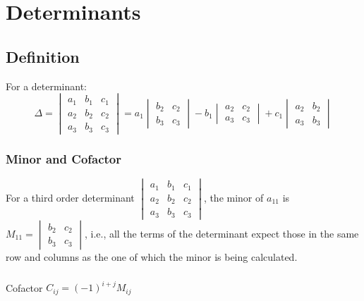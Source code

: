 \large{\chapter{Determinants}}
\section{Definition}
For a determinant:
\begin{equation}
	\Delta=\begin{vmatrix}
		a_1&b_1&c_1\\
		a_2&b_2&c_2\\
		a_3&b_3&c_3
	\end{vmatrix}=a_1\begin{vmatrix}b_2&c_2\\b_3&c_3\end{vmatrix}-b_1\begin{vmatrix}a_2&c_2\\a_3&c_3\end{vmatrix}+c_1\begin{vmatrix}a_2&b_2\\a_3&b_3\end{vmatrix}
\end{equation}
\subsection{Minor and Cofactor}
For a third order determinant
$\begin{vmatrix}
	a_1&b_1&c_1\\
	a_2&b_2&c_2\\
	a_3&b_3&c_3
\end{vmatrix}$, the minor of $a_{11}$ is $M_{11}=\begin{vmatrix}b_2&c_2\\b_3&c_3\end{vmatrix}$, i.e., all the terms of the determinant expect those in the same row and columns as the one of which the minor is being calculated.
\paragraph{}Cofactor $C_{ij}=(-1)^{i+j} M_{ij}$


